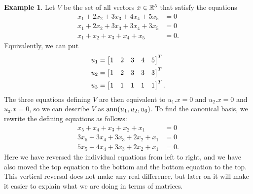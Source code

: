 \documentclass[reqno]{amsart}
\theoremstyle{definition}
\newtheorem{example}[theorem]{Example}
\begin{document}
\begin{example}\label{eg-ann-basis-ii}
 Let $V$ be the set of all vectors $x\in{\mathbb{R}}^5$ that satisfy the equations
 \begin{align*}
  x_1 + 2x_2 + 3x_3 + 4x_4 + 5x_5 &= 0 \\
  x_1 + 2x_2 + 3x_3 + 3x_4 + 3x_5 &= 0 \\
  x_1 +  x_2 +  x_3 +  x_4 +  x_5 &= 0.
 \end{align*}
 Equivalently, we can put
 \begin{align*}
  u_1 &= \left[\begin{matrix} 1 & 2 & 3 & 4 & 5 \end{matrix}\right]^T \\
  u_2 &= \left[\begin{matrix} 1 & 2 & 3 & 3 & 3 \end{matrix}\right]^T \\
  u_3 &= \left[\begin{matrix} 1 & 1 & 1 & 1 & 1 \end{matrix}\right]^T.
 \end{align*}
 The three equations defining $V$ are then equivalent to $u_1.x=0$ and
 $u_2.x=0$ and $u_3.x=0$, so we can describe $V$ as
 $\operatorname{ann}(u_1,u_2,u_3)$.  To find the canonical basis, we rewrite the
 defining equations as follows:
 \begin{align*}
   x_5 +  x_4 +  x_3 +  x_2 +  x_1 &= 0 \\
  3x_5 + 3x_4 + 3x_3 + 2x_2 +  x_1 &= 0 \\
  5x_5 + 4x_4 + 3x_3 + 2x_2 +  x_1 &= 0.
 \end{align*}
 Here we have reversed the individual equations from left to right,
 and we have also moved the top equation to the bottom and the bottom
 equation to the top.  This vertical reversal does not make any real
 difference, but later on it will make it easier to explain what we
 are doing in terms of matrices.


\end{example}
\end{document}
